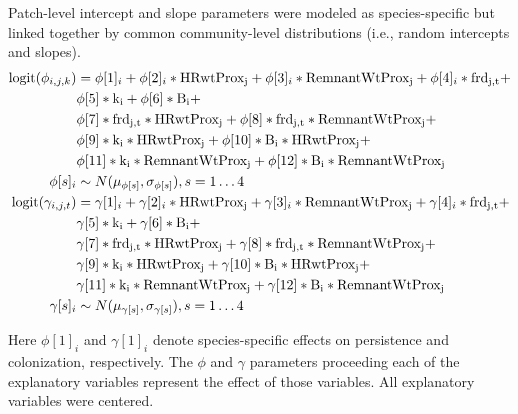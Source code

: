 \documentclass{article}\usepackage[]{graphicx}\usepackage[]{color}
\begin{document}
Patch-level intercept and slope parameters were modeled as species-specific but
linked together by common community-level distributions (i.e., random intercepts and slopes). 
%
\begin{equation}
  \begin{split}
    \label{eq:phi_gam}
    \mathrm{logit}(\phi_{i,j,k}) &=
    \phi[1]_i +
    \phi[2]_i* \mathrm{HRwtProx_j} +
    \phi[3]_i* \mathrm{RemnantWtProx_j} + 
     \phi[4]_i* \mathrm{frd_{j,t}} + \\
    & \phi[5]* \mathrm{k_i} + 
    \phi[6]* \mathrm{B_i} +  \\
    & \phi[7]* \mathrm{frd_{j,t}}*\mathrm{HRwtProx_j}  +
    \phi[8]* \mathrm{frd_{j,t}}*\mathrm{RemnantWtProx_j}  + \\
    & \phi[9]* \mathrm{k_i}*\mathrm{HRwtProx_j}  + 
      \phi[10]* \mathrm{B_i}*\mathrm{HRwtProx_j}  +  \\
   & \phi[11]* \mathrm{k_i}*\mathrm{RemnantWtProx_j}  +  \phi[12]* \mathrm{B_i}*\mathrm{RemnantWtProx_j} \\
    \phi[s]_i &\sim N(\mu_{\phi[s]}, \sigma_{\phi[s]}), s = 1 \ldots 4
    \hspace{0.2em}\\
    \mathrm{logit}(\gamma_{i,j,t}) &=
      \gamma[1]_i +
    \gamma[2]_i* \mathrm{HRwtProx_j} +
       \gamma[3]_i* \mathrm{RemnantWtProx_j} + 
     \gamma[4]_i* \mathrm{frd_{j,t}} + \\
    & \gamma[5]* \mathrm{k_i} +
    \gamma[6]* \mathrm{B_i} + \\
     & \gamma[7]* \mathrm{frd_{j,t}}*\mathrm{HRwtProx_j}  +
    \gamma[8]* \mathrm{frd_{j,t}}*\mathrm{RemnantWtProx_j}  + \\
    & \gamma[9]* \mathrm{k_i}*\mathrm{HRwtProx_j}  + 
    \gamma[10]* \mathrm{B_i}*\mathrm{HRwtProx_j}  + \\
    & \gamma[11]* \mathrm{k_i}*\mathrm{RemnantWtProx_j} + 
     \gamma[12]* \mathrm{B_i}*\mathrm{RemnantWtProx_j} \\
    \gamma[s]_i &\sim N(\mu_{\gamma[s]}, \sigma_{\gamma[s]}), s = 1 \ldots 4 \hspace{0.2em}\\
    \end{split}
\end{equation}
%

Here $\phi[1]_i$ and $\gamma[1]_i$ denote species-specific effects on
persistence and colonization, respectively. The $\phi$ and $\gamma$
parameters proceeding each of the explanatory variables represent the
effect of those variables. All explanatory variables were centered. 
\end{document}
